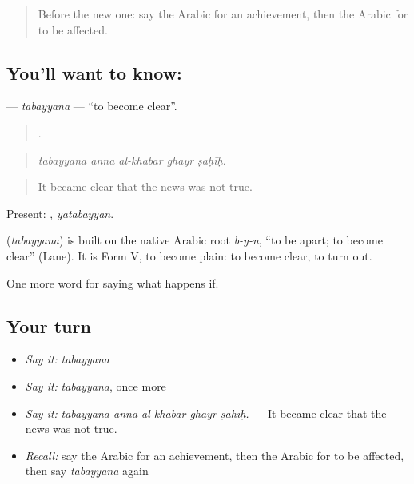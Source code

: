\label{lesson:AR-C415-tabayyana}



\begin{quote}
Before the new one: say the Arabic for an achievement, then the Arabic for to be affected.
\end{quote}

\subsection*{You'll want to know: }
\textbf{} — \emph{tabayyana} — \textquotedblleft{}to become clear\textquotedblright{}.

\begin{quote}
    .
\end{quote}

\begin{quote}
\emph{tabayyana anna al-khabar ghayr ṣaḥīḥ.}
\end{quote}

\begin{quote}
It became clear that the news was not true.
\end{quote}

Present: , \emph{yatabayyan}.

\begin{cousinweb}
\textbf{} (\emph{tabayyana}) is built on the native Arabic root \emph{b-y-n}, \textquotedblleft{}to be apart; to become clear\textquotedblright{} (Lane). It is Form V, to become plain: to become clear, to turn out.
\end{cousinweb}

\begin{grammarlens}[title={What you've built}]
One more word for saying what happens if.
\end{grammarlens}

\subsection*{Your turn}
\begin{itemize}
\raggedright
  \item \emph{Say it:} \emph{tabayyana}
  \item \emph{Say it:} \emph{tabayyana}, once more
  \item \emph{Say it:} \emph{tabayyana anna al-khabar ghayr ṣaḥīḥ.} — It became clear that the news was not true.
  \item \emph{Recall:} say the Arabic for an achievement, then the Arabic for to be affected, then say \emph{tabayyana} again
\end{itemize}


